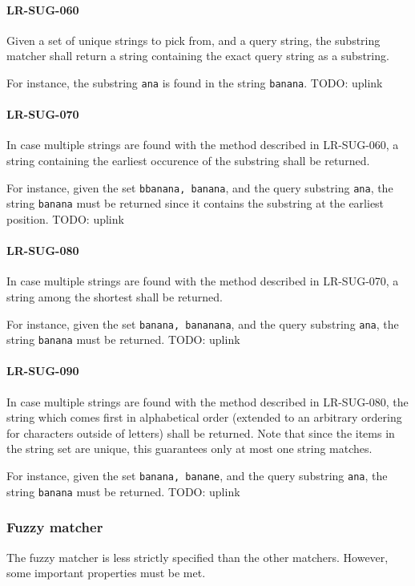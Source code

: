 \paragraph{LR-SUG-060}
Given a set of unique strings to pick from, and a query string,
the substring matcher shall return a string containing the
exact query string as a substring.

For instance, the substring \lstinline{ana} is found in
the string \lstinline{banana}.
TODO: uplink

\paragraph{LR-SUG-070}
In case multiple strings are found with the method described
in LR-SUG-060, a string containing the earliest occurence
of the substring shall be returned.

For instance, given the set \lstinline{bbanana, banana}, and the
query substring \lstinline{ana}, the string \lstinline{banana}
must be returned since it contains the substring at the earliest
position.
TODO: uplink

\paragraph{LR-SUG-080}
In case multiple strings are found with the method described
in LR-SUG-070, a string among the shortest shall be returned.

For instance, given the set \lstinline{banana, bananana}, and
the query substring \lstinline{ana}, the string \lstinline{banana}
must be returned.
TODO: uplink

\paragraph{LR-SUG-090}
In case multiple strings are found with the method described
in LR-SUG-080, the string which comes first in alphabetical order
(extended to an arbitrary ordering for characters outside of letters)
shall be returned. Note that since the items in the string set are unique,
this guarantees only at most one string matches.

For instance, given the set \lstinline{banana, banane}, and the query
substring \lstinline{ana}, the string \lstinline{banana} must be
returned.
TODO: uplink

\subsubsection{Fuzzy matcher}
The fuzzy matcher is less strictly specified than the other matchers. However,
some important properties must be met.

